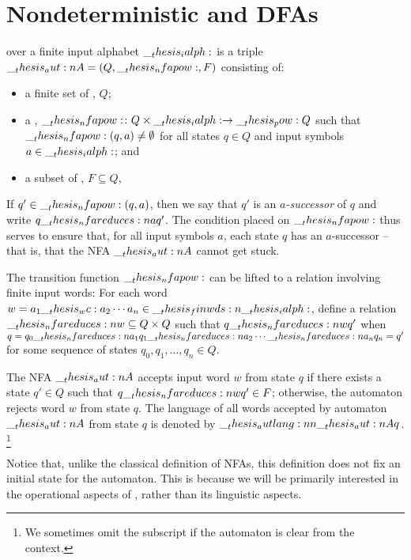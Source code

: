 \section{Nondeterministic and \aclp*{DFA}}

\begin{definition}
   over a finite input alphabet $\__thesis_ialph:$ is a triple $\__thesis_aut:n {A} = (Q, \__thesis_nfapow:, F)$ consisting of:
  \begin{itemize}
  \item a finite set of , $Q$;
  \item a , $\__thesis_nfapow:\colon Q \times \__thesis_ialph: \to \__thesis_pow: {Q}$ such that $\__thesis_nfapow:(q, a) \neq \emptyset$ for all states $q \in Q$ and input symbols $a \in \__thesis_ialph:$; and
  \item a subset of , $F \subseteq Q$,
  \end{itemize}
  If $q' \in \__thesis_nfapow:(q, a)$, then we say that $q'$ is an \emph{$a$-successor} of $q$ and write $q \nfareduces[a] q'$.
  The condition placed on $\__thesis_nfapow:$ thus serves to ensure that, for all input symbols $a$, each state $q$ has an $a$-successor -- that is, that the \ac{NFA} $\__thesis_aut:n {A}$ cannot get stuck.

  The transition function $\__thesis_nfapow:$ can be lifted to a relation involving finite input words: For each word $w = a_1 \wc a_2 \dotsm a_n \in \finwds{\ialph}$, define a relation $\mathord{\nfareduces[\smash{w}]} \subseteq Q \times Q$ such that $q \nfareduces[w] q'$ when $q = q_0 \nfareduces[a_1] q_1 \nfareduces[a_2] \dotsb \nfareduces[a_n] q_n = q'$ for some sequence of states $q_0, q_1, \dotsc, q_n \in Q$.

  The \ac{NFA} $\__thesis_aut:n {A}$ accepts input word $w$ from state $q$ if there exists a state $q' \in Q$ such that $q \nfareduces[w] q' \in F$;
  otherwise, the automaton rejects word $w$ from state $q$.
  The language of all words accepted by automaton $\__thesis_aut:n {A}$ from state $q$ is denoted by $\__thesis_autlang:nn {\__thesis_aut:n {A}} {q}$.%
  \footnote{We sometimes omit the subscript if the automaton is clear from the context.}
\end{definition}

Notice that, unlike the classical definition of \acp{NFA}, this definition does not fix an initial state for the automaton.
This is because we will be primarily interested in the operational aspects of , rather than its linguistic aspects.

